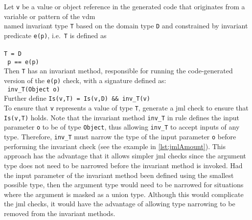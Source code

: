  { Let \texttt{v} be a
  value or object reference in the generated code that originates from
  a variable or pattern of the \ac{vdm}\\
  named invariant type \texttt{T} based on the domain type \texttt{D}
  and constrained
  by invariant predicate \texttt{e(p)}, i.e.\ \texttt{T} is defined as\\
  \\
  \texttt{T = D}\\
  \texttt{ p == e(p)}\\
  Then \texttt{T} has an invariant method, responsible for running the
  code-generated version of the \texttt{e(p)} check, with a signature
  defined as:\\
  \texttt{   inv\_T(Object o)}\\
  Further define
  \texttt{Is(v,T) = Is(v,D) \&\& inv\_T(v)}\\
  To ensure that \texttt{v} represents a value of type \texttt{T},
  generate a \ac{jml} check to ensure that \texttt{Is(v,T)} holds.}
%
%
Note that the invariant method \texttt{inv\_T} in rule
 defines the input parameter \texttt{o} to be of
type \texttt{Object}, thus allowing \texttt{inv\_T} to accept inputs
of any type. Therefore, \texttt{inv\_T} must narrow the type of the
input parameter \texttt{o} before performing the invariant check (see
the example in \autoref{lst:jmlAmount}). This approach has the
advantage that it allows simpler \ac{jml} checks since the argument
type does not need to be narrowed before the invariant method is
invoked. Had the input parameter of the invariant method been defined
using the smallest possible type, then the argument type would need to
be narrowed for situations where the argument is masked as a union
type. Although this would complicate the \ac{jml} checks, it would
have the advantage of allowing type narrowing to be removed from the
invariant methods.


